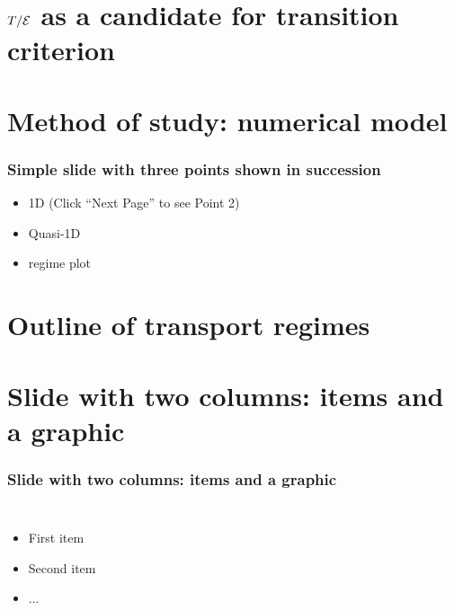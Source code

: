 \documentclass[]{beamer}
\begin{document}
\begin{frame}

\end{frame}

\section{$T/{\cal E}$ as a candidate for transition criterion}

\begin{frame}

\end{frame}

\section{Method of study: numerical model}

\begin{frame}
  \frametitle{Simple slide with three points shown in succession}   %

  \begin{itemize}
  \item<1-> 1D (Click ``Next Page'' to see Point 2) %
  \item<2-> Quasi-1D  %
  \item<3-> regime plot
  \end{itemize}
\end{frame}
                      
\section{Outline of transport regimes}

\begin{frame}

\end{frame}


\section{Slide with two columns: items and a graphic}

\begin{frame}
  \frametitle{Slide with two columns: items and a graphic}   %
  \begin{columns}[c]
  \column{2in}  %
  \begin{itemize}
  \item<1-> First item
  \item<2-> Second item
  \item<3-> ...
  \end{itemize}
  \column{2in}
  \end{columns}
\end{frame}
\end{document}
